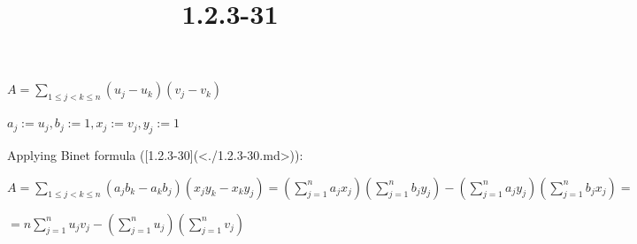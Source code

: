 \documentclass{article}
\title{1.2.3-31}
\begin{document}
\maketitle

$A = \sum_{1 \leq j < k \leq n} (u_j-u_k)(v_j-v_k)$

$a_j := u_j, b_j := 1, x_j := v_j, y_j := 1$

Applying Binet formula ([1.2.3-30](<./1.2.3-30.md>)):

$A = \sum_{1\leq j < k \leq n} (a_jb_k-a_kb_j)(x_jy_k-x_ky_j) = (\sum_{j=1}^n a_jx_j)(\sum_{j=1}^n b_jy_j) - (\sum_{j=1}^n a_jy_j)(\sum_{j=1}^n b_jx_j) =$

$= n \sum_{j=1}^n u_jv_j - (\sum_{j=1}^n u_j)(\sum_{j=1}^n v_j)$
\end{document}

